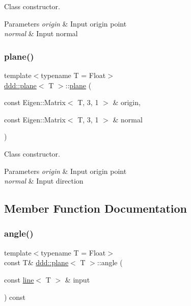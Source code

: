 Class constructor. 


\begin{DoxyParams}{Parameters}
{\em origin} & Input origin point \\
\hline
{\em normal} & Input normal \\
\hline
\end{DoxyParams}
\mbox{\label{classddd_1_1plane_a7d7d2a60448312343451246052d157c5}} 
\subsubsection{\texorpdfstring{plane()}{plane()}\hspace{0.1cm}{\footnotesize\ttfamily [2/2]}}
{\footnotesize\ttfamily template$<$typename T = Float$>$ \\
\hyperlink{classddd_1_1plane}{ddd\+::plane}$<$ T $>$\+::\hyperlink{classddd_1_1plane}{plane} (\begin{DoxyParamCaption}\item[{const Eigen\+::\+Matrix$<$ T, 3, 1 $>$ \&}]{origin,  }\item[{const Eigen\+::\+Matrix$<$ T, 3, 1 $>$ \&}]{normal }\end{DoxyParamCaption})\hspace{0.3cm}{\ttfamily [inline]}}



Class constructor. 


\begin{DoxyParams}{Parameters}
{\em origin} & Input origin point \\
\hline
{\em normal} & Input direction \\
\hline
\end{DoxyParams}


\subsection{Member Function Documentation}
\mbox{\label{classddd_1_1plane_a5107cac34cbae7ff286f0b0e9a90c940}} 
\subsubsection{\texorpdfstring{angle()}{angle()}\hspace{0.1cm}{\footnotesize\ttfamily [1/4]}}
{\footnotesize\ttfamily template$<$typename T = Float$>$ \\
const T\& \hyperlink{classddd_1_1plane}{ddd\+::plane}$<$ T $>$\+::angle (\begin{DoxyParamCaption}\item[{const \hyperlink{classddd_1_1line}{line}$<$ T $>$ \&}]{input }\end{DoxyParamCaption}) const\hspace{0.3cm}{\ttfamily [inline]}}



